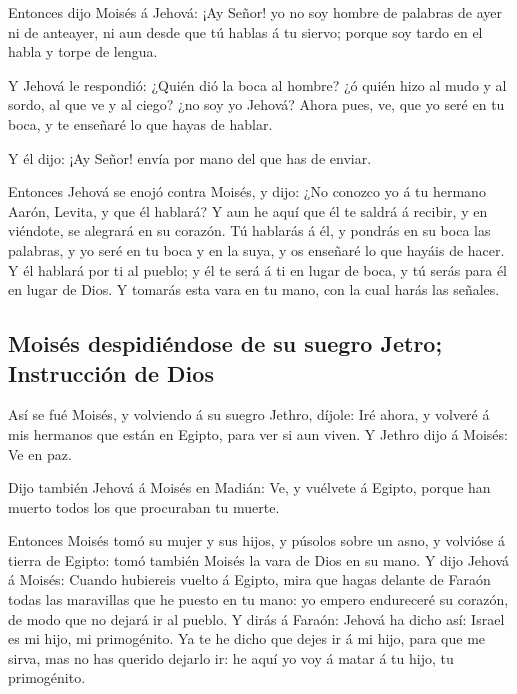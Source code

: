 Entonces dijo Moisés á Jehová: ¡Ay Señor! yo no soy hombre
de palabras de ayer ni de anteayer, ni aun desde que tú hablas á tu
siervo; porque soy tardo en el habla y torpe de lengua.

 Y Jehová le respondió: ¿Quién dió la boca al hombre? ¿ó
quién hizo al mudo y al sordo, al que ve y al ciego? ¿no soy yo Jehová?
 Ahora pues, ve, que yo seré en tu boca, y te enseñaré lo
que hayas de hablar.

 Y él dijo: ¡Ay Señor! envía por mano del que has de
enviar.

 Entonces Jehová se enojó contra Moisés, y dijo: ¿No
conozco yo á tu hermano Aarón, Levita, y que él hablará? Y aun he aquí
que él te saldrá á recibir, y en viéndote, se alegrará en su corazón.
 Tú hablarás á él, y pondrás en su boca las palabras, y yo
seré en tu boca y en la suya, y os enseñaré lo que hayáis de hacer.
 Y él hablará por ti al pueblo; y él te será á ti en lugar
de boca, y tú serás para él en lugar de Dios.  Y tomarás
esta vara en tu mano, con la cual harás las señales.

\hypertarget{moisuxe9s-despidiuxe9ndose-de-su-suegro-jetro-instrucciuxf3n-de-dios}{%
\subsection{Moisés despidiéndose de su suegro Jetro; Instrucción de
Dios}\label{moisuxe9s-despidiuxe9ndose-de-su-suegro-jetro-instrucciuxf3n-de-dios}}

 Así se fué Moisés, y volviendo á su suegro Jethro, díjole:
Iré ahora, y volveré á mis hermanos que están en Egipto, para ver si aun
viven. Y Jethro dijo á Moisés: Ve en paz.

 Dijo también Jehová á Moisés en Madián: Ve, y vuélvete á
Egipto, porque han muerto todos los que procuraban tu muerte.

 Entonces Moisés tomó su mujer y sus hijos, y púsolos sobre
un asno, y volvióse á tierra de Egipto: tomó también Moisés la vara de
Dios en su mano.  Y dijo Jehová á Moisés: Cuando hubiereis
vuelto á Egipto, mira que hagas delante de Faraón todas las maravillas
que he puesto en tu mano: yo empero endureceré su corazón, de modo que
no dejará ir al pueblo.  Y dirás á Faraón: Jehová ha dicho
así: Israel es mi hijo, mi primogénito.  Ya te he dicho que
dejes ir á mi hijo, para que me sirva, mas no has querido dejarlo ir: he
aquí yo voy á matar á tu hijo, tu primogénito.

